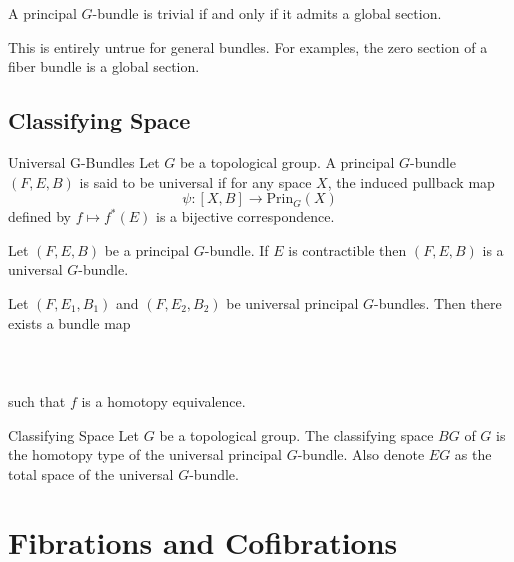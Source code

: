 \documentclass[a4paper]{article}
\begin{document}
\begin{thm}{}{} A principal $G$-bundle is trivial if and only if it admits a global section. 
\end{thm}

This is entirely untrue for general bundles. For examples, the zero section of a fiber bundle is a global section. 

\subsection{Classifying Space}
\begin{defn}{Universal G-Bundles}{} Let $G$ be a topological group. A principal $G$-bundle $(F,E,B)$ is said to be universal if for any space $X$, the induced pullback map $$\psi:[X,B]\to\text{Prin}_G(X)$$ defined by $f\mapsto f^\ast(E)$ is a bijective correspondence. 
\end{defn}

\begin{thm}{}{} Let $(F,E,B)$ be a principal $G$-bundle. If $E$ is contractible then $(F,E,B)$ is a universal $G$-bundle. 
\end{thm}

\begin{thm}{}{} Let $(F,E_1,B_1)$ and $(F,E_2,B_2)$ be universal principal $G$-bundles. Then there exists a bundle map \\~\\
\\~\\
such that $f$ is a homotopy equivalence. 
\end{thm}

\begin{defn}{Classifying Space}{} Let $G$ be a topological group. The classifying space $BG$ of $G$ is the homotopy type of the universal principal $G$-bundle. Also denote $EG$ as the total space of the universal $G$-bundle. 
\end{defn}


\pagebreak
\section{Fibrations and Cofibrations}
\end{document}
